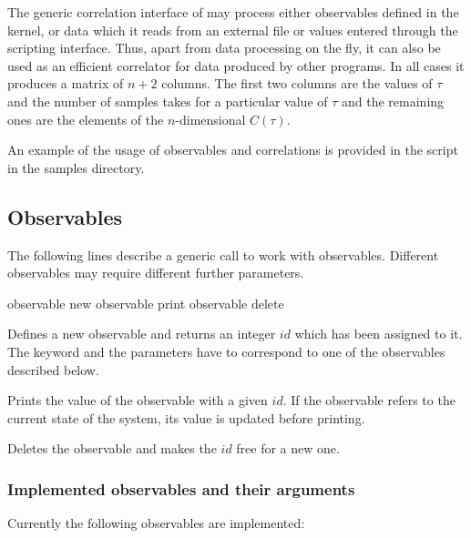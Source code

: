 The generic correlation interface of \es may process either observables
defined in the kernel, or data which it reads from an external file
or values entered through the scripting interface. 
Thus, apart from
data processing on the fly, it can also be used as an efficient correlator
for data produced by other programs. In all cases it produces a matrix of 
$n+2$ columns. The first two columns are the values of $\tau$ and 
the number of samples takes for a particular value of $\tau$ and the
remaining ones are the elements of the $n$-dimensional $C(\tau)$.


An example of the usage of observables and correlations is provided 
in the script  in the samples directory.

\subsection{Observables}
The following lines describe a generic call to work with 
observables. Different observables may require different further parameters.
\begin{essyntax}
   observable new  
   observable  print 
   observable  delete
\end{essyntax}
  
Defines a new observable and returns an integer $id$ which has been assigned to it.
The keyword  and the parameters have to correspond to one of the
observables described below.

 Prints the value of the observable with a given $id$. If the observable
refers to the current state of the system, its value is updated before printing.

 Deletes the observable and makes the $id$ free for a new one.

\subsubsection{Implemented observables and their arguments}
Currently the following observables are implemented:

